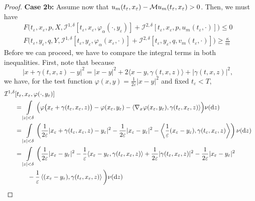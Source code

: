 \begin{proof}
    \textbf{Case 2b:} Assume now that $u_m(t_\varepsilon, x_\varepsilon) - \mathcal{M} u_m(t_\varepsilon, x_\varepsilon) > 0$. Then, we must have 
    \begin{align}
        F \big( t_\varepsilon, x_\varepsilon, p, X, \mathcal I^{1,\delta}[t_\varepsilon, x_\varepsilon, \varphi_\alpha(\cdot, y_\varepsilon)] + \mathcal I^{2,\delta}[t_\varepsilon, x_\varepsilon, p, u_m(t_\varepsilon, \cdot)] \big) \leq 0 \label{eqn: (44) in Seydel} \\
        F \big( t_\varepsilon, y_\varepsilon, q, Y, \mathcal I^{1,\delta}[t_\varepsilon, y_\varepsilon, \varphi_\alpha(x_\varepsilon, \cdot)] + \mathcal I^{2,\delta}[t_\varepsilon, y_\varepsilon, q, v_m(t_\varepsilon, \cdot)] \big) \geq \frac{\kappa}{m} \label{eqn: (45) in Seydel}
    \end{align}
    Before we can proceed, we have to compare the integral terms in both inequalities. First, note that because
    \begin{equation*}
        |x+\gamma(t,x,z)-y|^2 = |x-y|^2 + 2\langle x-y,\gamma(t,x,z)\rangle + |\gamma(t,x,z)|^2,
    \end{equation*}
    we have, for the test function $\varphi(x,y) = \frac{1}{2\varepsilon}|x-y|^2$ and fixed $t_\varepsilon < T$,
    \begin{align*}
        \mathcal{I}^{1,\delta} &[t_\varepsilon, x_\varepsilon, \varphi(\cdot, y_\varepsilon)]\\
        & = \int\limits_{|z|<\delta} \Big( \varphi \big( x_\varepsilon + \gamma(t_\varepsilon,x_\varepsilon,z) \big) - \varphi(x_\varepsilon,y_\varepsilon) - \langle \nabla_x \varphi(x_\varepsilon,y_\varepsilon), \gamma(t_\varepsilon,x_\varepsilon,z) \rangle \Big) \nu(\diff z) \\
        &= \int\limits_{|z|<\delta} \left( \frac{1}{2\varepsilon} |x_\varepsilon + \gamma(t_\varepsilon,x_\varepsilon,z) - y_\varepsilon|^2 - \frac{1}{2\varepsilon} |x_\varepsilon - y_\varepsilon|^2 - \left\langle \frac 1 \varepsilon (x_\varepsilon-y_\varepsilon), \gamma(t_\varepsilon,x_\varepsilon,z) \right\rangle \right) \nu(\diff z) \\
        &= \int\limits_{|z|<\delta} \bigg( \frac{1}{2\varepsilon} |x_\varepsilon - y_\varepsilon|^2 - \frac{1}{\varepsilon}\langle x_\varepsilon - y_\varepsilon,\gamma(t_\varepsilon,x_\varepsilon,z) \rangle + \frac{1}{2\varepsilon}|\gamma(t_\varepsilon,x_\varepsilon,z)|^2 - \frac{1}{2\varepsilon} |x_\varepsilon - y_\varepsilon|^2 \\
        & \qquad - \frac 1 \varepsilon \left\langle (x_\varepsilon-y_\varepsilon), \gamma(t_\varepsilon,x_\varepsilon,z) \right\rangle \bigg) \nu(\diff z) \\

\end{align*}
\end{proof}
